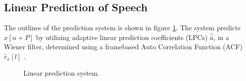 \subsection{Linear Prediction of Speech}
The outlines of the prediction system is shown in figure \ref{fig:LinearPredictionOverview}. The system predicts $\hat{x}[n+P]$ by utilizing adaptive linear prediction coefficients (LPCs) $\hat{\bar{a}}$, in a Wiener filter, determined using a framebased Auto Correlation Function (ACF) $\hat{r}_x[l]$ \cite{LinearPrediction}.   

\begin{figure}[H]
	\centering
	
	\caption{Linear prediction system.}
	\label{fig:LinearPredictionOverview}
\end{figure}


